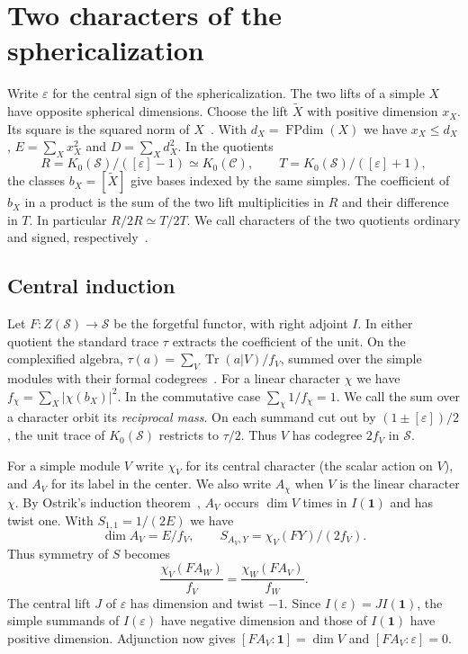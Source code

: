 \documentclass[11pt,reqno]{amsart}
\theoremstyle{remark}\newtheorem{remark}[theorem]{Remark}
\numberwithin{equation}{section}
\begin{document}
\tableofcontents
\section{Two characters of the sphericalization}

Write $\varepsilon$ for the central sign of the sphericalization.
The two lifts of a simple $X$ have opposite spherical dimensions. Choose
the lift $\widetilde X$ with positive dimension $x_X$. Its square is
the squared norm of $X$~\cite[Theorem~2.3 and Remark~3.1]{ENO}. With
$d_X=\operatorname{FPdim}(X)$ we have $x_X\le d_X$,
$E=\sum_X x_X^2$ and $D=\sum_X d_X^2$. In the quotients
\[
 R=K_0(\mathcal S)/([\varepsilon]-1)\simeq K_0(\mathcal C),\qquad
 T=K_0(\mathcal S)/([\varepsilon]+1),
\]
the classes $b_X=[\widetilde X]$ give bases indexed by the same simples.
The coefficient of $b_X$ in a product is the sum of the two lift
multiplicities in $R$ and their difference in $T$. In particular
$R/2R\simeq T/2T$. We call characters of the two quotients ordinary
and signed, respectively~\cite[\S5.1]{Ostrik3}.

\subsection{Central induction}
Let $F:Z(\mathcal S)\to\mathcal S$ be the forgetful functor, with right
adjoint $I$. In either quotient the standard trace $\tau$ extracts
the coefficient of the unit. On the complexified algebra,
$\tau(a)=\sum_V\operatorname{Tr}(a|V)/f_V$, summed over the simple
modules with their formal codegrees~\cite[\S2]{OstrikCodegrees}.
For a linear character $\chi$ we have
$f_\chi=\sum_X|\chi(b_X)|^2$. In the commutative case
$\sum_\chi 1/f_\chi=1$. We call the sum over a character orbit
its \emph{reciprocal mass}. On each summand cut out by
$(1\pm[\varepsilon])/2$, the unit trace of $K_0(\mathcal S)$
restricts to $\tau/2$. Thus $V$ has codegree $2f_V$ in $\mathcal S$.

For a simple module $V$ write $\chi_V$ for its central character
(the scalar action on $V$), and $A_V$ for its label in the center.
We also write $A_\chi$ when $V$ is the linear character $\chi$.
By Ostrik's induction theorem~\cite[Example~2.9 and Theorems~2.5 and~2.13]{Ostrik3},
$A_V$ occurs $\dim V$ times in $I(\mathbf1)$ and has twist one.
With $S_{1,1}=1/(2E)$ we have
\[
      \dim A_V=E/f_V,\qquad S_{A_V,Y}=\chi_V(FY)/(2f_V).
\]
Thus symmetry of $S$ becomes
\begin{equation}\label{eq:induction-reciprocity}
       \frac{\chi_V(F A_W)}{f_V}=\frac{\chi_W(F A_V)}{f_W}.
\end{equation}
The central lift $J$ of $\varepsilon$ has dimension and twist $-1$.
Since $I(\varepsilon)=JI(\mathbf1)$, the simple summands of
$I(\varepsilon)$ have negative dimension and those of $I(\mathbf1)$
have positive dimension. Adjunction now gives
$[F A_V:\mathbf1]=\dim V$ and $[F A_V:\varepsilon]=0$.
\end{document}
